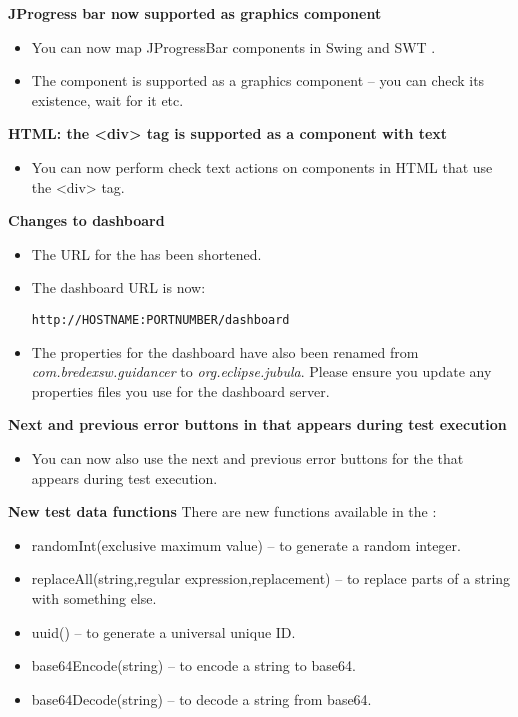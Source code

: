 \textbf{JProgress bar now supported as graphics component}
\begin{itemize}
\item You can now map JProgressBar components in Swing and SWT \gdauts{}.
\item The component is supported as a graphics component -- you can check its existence, wait for it etc.
\end{itemize}

\textbf{HTML: the <div> tag is supported as a component with text}
\begin{itemize}
\item You can now perform check text actions on components in HTML \gdauts{} that use the <div> tag.
\end{itemize}

\textbf{Changes to dashboard}
\begin{itemize}
\item The URL for the \dash{} has been shortened. 
\item The dashboard URL is now:
\begin{verbatim}
http://HOSTNAME:PORTNUMBER/dashboard
\end{verbatim}
\item The properties for the dashboard have also been renamed from \textit{com.bredexsw.guidancer} to \textit{org.eclipse.jubula}. Please ensure you update any properties files you use for the dashboard server.
\end{itemize}

\textbf{Next and previous error buttons in \gdtestresultview{} that appears during test execution}
\begin{itemize}
\item You can now also use the next and previous error buttons for the \gdtestresultview{} that appears during test execution.
\end{itemize}

\textbf{New test data functions}
There are new functions available in the \ite{}:
\begin{itemize}
\item randomInt(exclusive maximum value) -- to generate a random integer.
\item replaceAll(string,regular expression,replacement) -- to replace parts of a string with something else.
\item uuid() -- to generate a universal unique ID.
\item base64Encode(string) -- to encode a string to base64.
\item base64Decode(string) -- to decode a string from base64.
\end{itemize}
